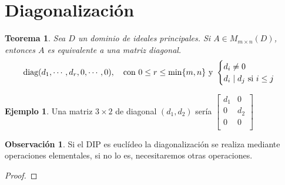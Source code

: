 \documentclass{article}
\theoremstyle{theorem-style}  %
\newtheorem{theorem}{Teorema}[section]  %
\theoremstyle{definition}
\newtheorem*{observation}{Observación} %
\theoremstyle{example-style}
\newtheorem{example}{Ejemplo}[section]
\begin{document}
	\section{Diagonalización}
	\begin{theorem}
		Sea $ D $ un dominio de ideales principales. Si $ A \in M_{m\times n}(D) $, entonces $ A $ es equivalente a una matriz diagonal.
		\[ \text{diag}(d_1, \cdots, d_r, 0, \cdots, 0), \quad \text{con } 0\leq r \leq \min \{m,n\} \text{ y }\begin{cases}
			d_i\neq 0\\
			d_i \mid d_j $ si $ i\leq j
		\end{cases}\]
		
		
	\end{theorem}
	\begin{example}
		Una matriz $3\times 2$ de diagonal $(d_1,d_2)$ sería $\begin{bmatrix}
		d_1 & 0  \\
		0   & d_2\\
		0   & 0  \\
		\end{bmatrix}$
	\end{example}
	\begin{observation}
		Si el DIP es euclídeo la diagonalización se realiza mediante operaciones elementales, si no lo es, necesitaremos otras operaciones.
	\end{observation}
	\begin{proof}
		
	\end{proof}
\end{document}
